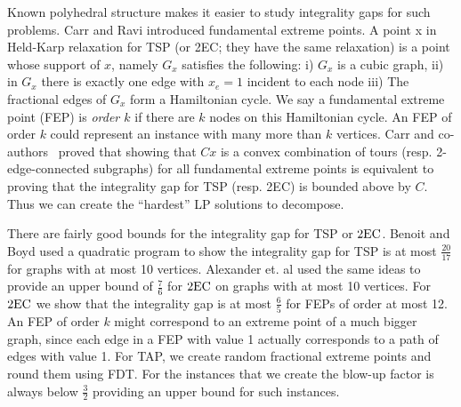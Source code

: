 Known polyhedral structure makes it easier to study integrality gaps for such problems. Carr and Ravi \cite{carr-ravi} introduced fundamental extreme points. A point x in Held-Karp relaxation for TSP (or 2EC; they have the same relaxation) is a point whose support of $x$, namely $G_x$ satisfies the following: i)  $G_x$ is a cubic graph, ii) in $G_x$ there is exactly one edge with $x_e=1$ incident to each node iii) The fractional edges of $G_x$ form a Hamiltonian cycle.  We say a fundamental extreme point (FEP) is {\em order $k$} if there are $k$ nodes on this Hamiltonian cycle. An FEP of order $k$ could represent an instance with many more than $k$ vertices. Carr and co-authors~\cite{CV,carr-ravi, BC11} proved that showing that $Cx$ is a convex combination of tours (resp. 2-edge-connected subgraphs) for all fundamental extreme points is equivalent to proving that the integrality gap for TSP (resp. 2EC) is bounded above by $C$. Thus we can create the ``hardest'' LP solutions to decompose.

There are fairly good bounds for the integrality gap for TSP or $\operatorname{2EC}$. Benoit and Boyd \cite{TSPcompute} used a quadratic program to show the integrality gap for TSP is at most $\frac{20}{17}$ for graphs with at most 10 vertices. Alexander et. al \cite{abe} used the same ideas to provide an upper bound of $\frac{7}{6}$ for $\operatorname{2EC}$ on graphs with at most 10 vertices. For $\operatorname{2EC}$ we show that the integrality gap is at most $\frac{6}{5}$ for FEPs of order at most 12. An FEP of order $k$ might correspond to an extreme point of a much bigger graph, since each edge in a FEP with value 1 actually corresponds to a path of edges with value 1.
For TAP, we create random fractional extreme points and round them using FDT. For the instances that we create the blow-up factor is always below $\frac{3}{2}$ providing an upper bound for such instances.




